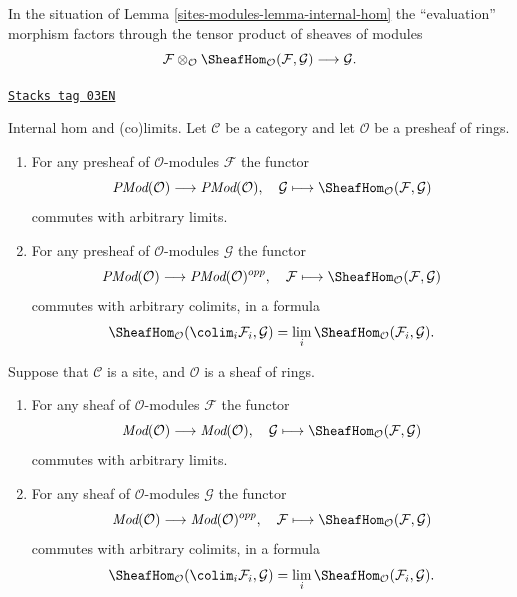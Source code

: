 In the situation of Lemma \ref{sites-modules-lemma-internal-hom}
the ``evaluation'' morphism
factors through the tensor product of sheaves of modules
$$
\mathcal{F}
\otimes_\mathcal{O}
\SheafHom_\mathcal{O}(\mathcal{F}, \mathcal{G})
\longrightarrow
\mathcal{G}.
$$

\begin{lemma}
\label{sites-modules-lemma-internal-hom-commute-limits}
\href{https://stacks.math.columbia.edu/tag/03EN}{\texttt{Stacks tag 03EN}}

Internal hom and (co)limits.
Let $\mathcal{C}$ be a category and let $\mathcal{O}$ be a presheaf of rings.
\begin{enumerate}
\item For any presheaf of $\mathcal{O}$-modules $\mathcal{F}$ the functor
$$
\textit{PMod}(\mathcal{O}) \longrightarrow \textit{PMod}(\mathcal{O})
, \quad
\mathcal{G} \longmapsto \SheafHom_\mathcal{O}(\mathcal{F}, \mathcal{G})
$$
commutes with arbitrary limits.
\item For any presheaf of $\mathcal{O}$-modules $\mathcal{G}$ the functor
$$
\textit{PMod}(\mathcal{O}) \longrightarrow \textit{PMod}(\mathcal{O})^{opp}
, \quad
\mathcal{F} \longmapsto \SheafHom_\mathcal{O}(\mathcal{F}, \mathcal{G})
$$
commutes with arbitrary colimits, in a formula
$$
\SheafHom_\mathcal{O}(\colim_i \mathcal{F}_i, \mathcal{G})
=
\lim_i \SheafHom_\mathcal{O}(\mathcal{F}_i, \mathcal{G}).
$$
\end{enumerate}
Suppose that $\mathcal{C}$ is a site, and $\mathcal{O}$ is a sheaf of rings.
\begin{enumerate}
\item[(3)] For any sheaf of $\mathcal{O}$-modules $\mathcal{F}$ the functor
$$
\textit{Mod}(\mathcal{O}) \longrightarrow \textit{Mod}(\mathcal{O})
, \quad
\mathcal{G} \longmapsto \SheafHom_\mathcal{O}(\mathcal{F}, \mathcal{G})
$$
commutes with arbitrary limits.
\item[(4)] For any sheaf of $\mathcal{O}$-modules $\mathcal{G}$ the functor
$$
\textit{Mod}(\mathcal{O}) \longrightarrow \textit{Mod}(\mathcal{O})^{opp}
, \quad
\mathcal{F} \longmapsto \SheafHom_\mathcal{O}(\mathcal{F}, \mathcal{G})
$$
commutes with arbitrary colimits, in a formula
$$
\SheafHom_\mathcal{O}(\colim_i \mathcal{F}_i, \mathcal{G})
=
\lim_i \SheafHom_\mathcal{O}(\mathcal{F}_i, \mathcal{G}).
$$
\end{enumerate}
\end{lemma}

